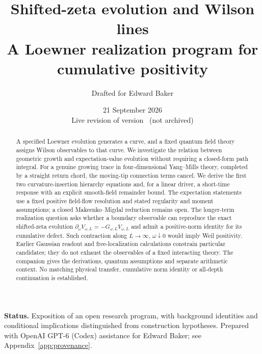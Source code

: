 \documentclass[11pt]{article}
\title{Shifted-zeta evolution and Wilson lines\\[3pt]
\large A Loewner realization program for cumulative positivity}
\author{Drafted for Edward Baker}
\date{21 September 2026 \\[2pt] Live revision of version \draftversion\ (not archived)}
\begin{document}
\maketitle
\begin{abstract}
A specified Loewner evolution generates a curve, and a fixed quantum field
theory assigns Wilson observables to that curve. We investigate the relation
between geometric growth and expectation-value evolution without requiring
a closed-form path integral. For a genuine growing trace in four-dimensional
Yang--Mills theory, completed by a straight return chord, the moving-tip
connection terms cancel. We derive the first two curvature-insertion
hierarchy equations and, for a linear driver, a short-time response with
an explicit smooth-field remainder bound. The expectation statements use
a fixed positive field-flow resolution and stated regularity and moment
assumptions; a closed Makeenko--Migdal reduction remains open. The longer-term
realization question asks whether a boundary observable can reproduce the
exact shifted-zeta evolution
$\partial_\omega V_{\omega,L}=-G_{\omega,L}V_{\omega,L}$ and admit a
positive-norm identity for its cumulative defect. Such contraction along
$L\to\infty$, $\omega\downarrow0$ would imply Weil positivity. Earlier
Gaussian readout and free-localization calculations constrain particular
candidates; they do not exhaust the observables of a fixed interacting
theory. The companion gives the derivations, quantum assumptions and
separate arithmetic context. No matching physical transfer, cumulative
norm identity or all-depth continuation is established.
\end{abstract}
\noindent\textbf{Status.} Exposition of an open research program, with
background identities and conditional implications distinguished from
construction hypotheses. Prepared with OpenAI GPT-6 (Codex) assistance
for Edward Baker; see Appendix~\ref{app:provenance}.
\tableofcontents










\appendix


\end{document}
